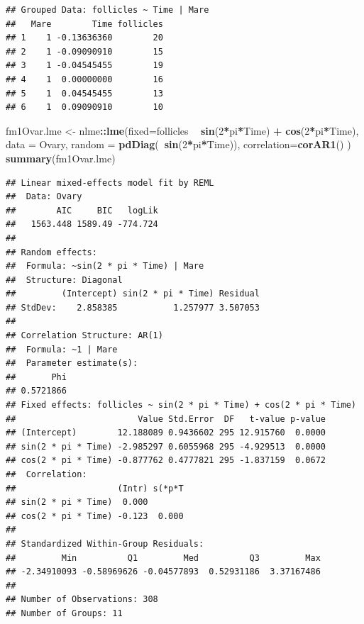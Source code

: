 \documentclass[]{book}
\newenvironment{Shaded}{\begin{snugshade}}{\end{snugshade}}
\newcommand{\DataTypeTok}[1]{\textcolor[rgb]{0.13,0.29,0.53}{#1}}
\newcommand{\DecValTok}[1]{\textcolor[rgb]{0.00,0.00,0.81}{#1}}
\newcommand{\KeywordTok}[1]{\textcolor[rgb]{0.13,0.29,0.53}{\textbf{#1}}}
\newcommand{\NormalTok}[1]{#1}
\newcommand{\OperatorTok}[1]{\textcolor[rgb]{0.81,0.36,0.00}{\textbf{#1}}}
\newcommand{\StringTok}[1]{\textcolor[rgb]{0.31,0.60,0.02}{#1}}
\theoremstyle{definition}
\theoremstyle{definition}
\theoremstyle{definition}
\theoremstyle{remark}
\begin{document}
\begin{verbatim}
## Grouped Data: follicles ~ Time | Mare
##   Mare        Time follicles
## 1    1 -0.13636360        20
## 2    1 -0.09090910        15
## 3    1 -0.04545455        19
## 4    1  0.00000000        16
## 5    1  0.04545455        13
## 6    1  0.09090910        10
\end{verbatim}

\begin{Shaded}
\begin{Highlighting}[]
\NormalTok{fm1Ovar.lme <-}\StringTok{ }\NormalTok{nlme}\OperatorTok{::}\KeywordTok{lme}\NormalTok{(}\DataTypeTok{fixed=}\NormalTok{follicles }\OperatorTok{~}\StringTok{ }\KeywordTok{sin}\NormalTok{(}\DecValTok{2}\OperatorTok{*}\NormalTok{pi}\OperatorTok{*}\NormalTok{Time) }\OperatorTok{+}\StringTok{ }\KeywordTok{cos}\NormalTok{(}\DecValTok{2}\OperatorTok{*}\NormalTok{pi}\OperatorTok{*}\NormalTok{Time), }
                   \DataTypeTok{data =}\NormalTok{ Ovary, }
                   \DataTypeTok{random =} \KeywordTok{pdDiag}\NormalTok{(}\OperatorTok{~}\KeywordTok{sin}\NormalTok{(}\DecValTok{2}\OperatorTok{*}\NormalTok{pi}\OperatorTok{*}\NormalTok{Time)), }
                   \DataTypeTok{correlation=}\KeywordTok{corAR1}\NormalTok{() )}
\KeywordTok{summary}\NormalTok{(fm1Ovar.lme)}
\end{Highlighting}
\end{Shaded}

\begin{verbatim}
## Linear mixed-effects model fit by REML
##  Data: Ovary 
##        AIC     BIC   logLik
##   1563.448 1589.49 -774.724
## 
## Random effects:
##  Formula: ~sin(2 * pi * Time) | Mare
##  Structure: Diagonal
##         (Intercept) sin(2 * pi * Time) Residual
## StdDev:    2.858385           1.257977 3.507053
## 
## Correlation Structure: AR(1)
##  Formula: ~1 | Mare 
##  Parameter estimate(s):
##       Phi 
## 0.5721866 
## Fixed effects: follicles ~ sin(2 * pi * Time) + cos(2 * pi * Time) 
##                        Value Std.Error  DF   t-value p-value
## (Intercept)        12.188089 0.9436602 295 12.915760  0.0000
## sin(2 * pi * Time) -2.985297 0.6055968 295 -4.929513  0.0000
## cos(2 * pi * Time) -0.877762 0.4777821 295 -1.837159  0.0672
##  Correlation: 
##                    (Intr) s(*p*T
## sin(2 * pi * Time)  0.000       
## cos(2 * pi * Time) -0.123  0.000
## 
## Standardized Within-Group Residuals:
##         Min          Q1         Med          Q3         Max 
## -2.34910093 -0.58969626 -0.04577893  0.52931186  3.37167486 
## 
## Number of Observations: 308
## Number of Groups: 11
\end{verbatim}
\end{document}
